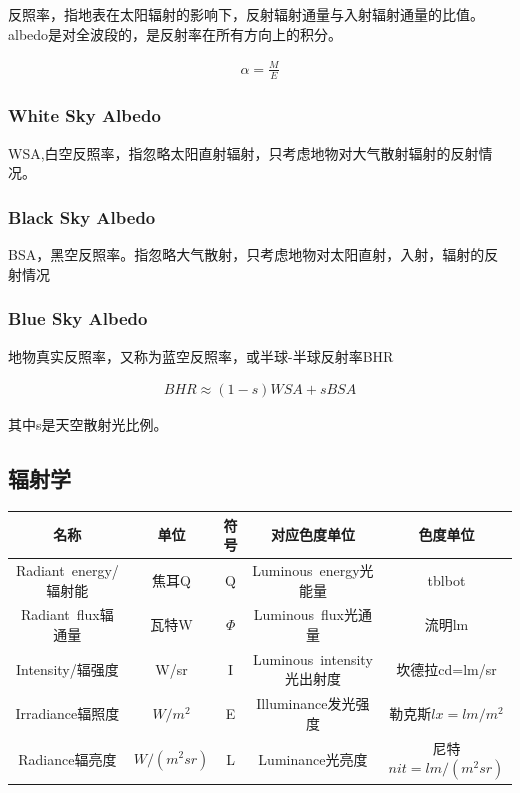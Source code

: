 反照率，指地表在太阳辐射的影响下，反射辐射通量与入射辐射通量的比值。albedo是对全波段的，是反射率在所有方向上的积分。

\begin{align*}
    \alpha = \frac{M}{E}
\end{align*}

\subsubsection{White Sky Albedo}

WSA,白空反照率，指忽略太阳直射辐射，只考虑地物对大气散射辐射的反射情况。

\subsubsection{Black Sky Albedo}

BSA，黑空反照率。指忽略大气散射，只考虑地物对太阳直射，入射，辐射的反射情况

\subsubsection{Blue Sky Albedo}

地物真实反照率，又称为蓝空反照率，或半球-半球反射率BHR

\begin{align*}
    BHR \approx (1-s)WSA + sBSA 
\end{align*}

其中s是天空散射光比例。

\subsection{辐射学}

\begin{center}
    \begin{tabular}{|c|c|c|c|c|} \hline
       \hbox{名称} & \hbox{单位} & \hbox{符号} & \hbox{对应色度单位} & \hbox{色度单位} \\ \hline
       \hbox{Radiant energy/辐射能} & \hbox{焦耳Q} & \hbox{Q} & \hbox{Luminous energy光能量}  & \hbox{tblbot} \\ \hline
       \hbox{Radiant flux辐通量} & \hbox{瓦特W} & \hbox{$\Phi$} & \hbox{Luminous flux光通量}  & \hbox{流明lm} \\ \hline
       \hbox{Intensity/辐强度} & \hbox{W/sr} & \hbox{I} & \hbox{Luminous intensity光出射度}  & \hbox{坎德拉cd=lm/sr} \\ \hline
       \hbox{Irradiance辐照度} & \hbox{$W/m^{2}$} & \hbox{E} & \hbox{Illuminance发光强度}  & \hbox{勒克斯$lx=lm/m^{2}$} \\ \hline
       \hbox{Radiance辐亮度} & \hbox{$W/(m^{2}sr)$} & \hbox{L} & \hbox{Luminance光亮度}  & \hbox{尼特$nit=lm/(m^{2}sr)$} \\ \hline
    \end{tabular}
\end{center}

